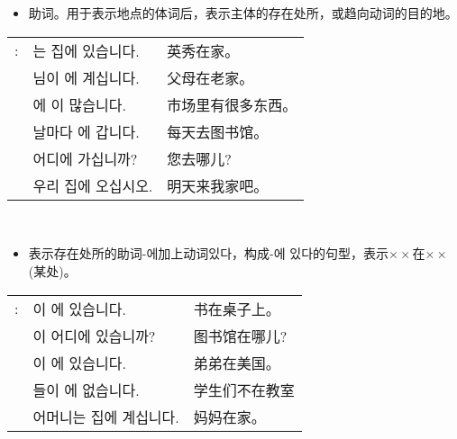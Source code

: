 \section{\kr{}}
\begin{grammar}
    \begin{grammarsect}[\kr -에]
        \begin{itemize}
            \item 助词。用于表示地点的体词后，表示主体的存在处所，或趋向动词的目的地。
        \end{itemize}
        \begin{tabular}{lll}
            \kr\ruby{例}{예}:& \kr\ruby{英秀}{영수}는 집에 있습니다.&英秀在家。\\
            &\kr\ruby{父母}{부모}님이 \ruby{故鄉}{고향}에 계십니다.&父母在老家。\\
            &\kr\ruby{市場}{시장}에 \ruby{物件}{물건}이 많습니다.&市场里有很多东西。\\
            &\kr 날마다 \ruby{圖書館}{도서관}에 갑니다.&每天去图书馆。\\
            &\kr 어디에 가십니까?&您去哪儿?\\
            &\kr\ruby{來日}{내일} 우리 집에 오십시오.&明天来我家吧。
        \end{tabular}\\
        \begin{itemize}
            \item 表示存在处所的助词{\kr-에}加上动词{\kr 있다}，构成{\kr -에 있다}的句型，表示$\times \times$在$\times \times$ (某处)。
        \end{itemize}
        \begin{tabular}{lll}
            \kr \ruby{例}{예}:&\kr \ruby{冊}{책}이 \ruby{冊床}{책상}에 있습니다.&书在桌子上。\\ 
            &\kr \ruby{圖書館}{도서관}이 어디에 있습니까?&图书馆在哪儿?\\
            &\kr \ruby{同生}{동생}이 \ruby{美國}{미국}에 있습니다.&弟弟在美国。\\
            &\kr \ruby{學生}{학생}들이 \ruby{教室}{교실}에 없습니다.&学生们不在教室\\
            &\kr 어머니는 집에 계십니다.&妈妈在家。\\
        \end{tabular}\\
    \end{grammarsect}
    \begin{grammarsect}[\kr 여기, 거기, 저기]

\end{grammarsect}
\end{grammar}
